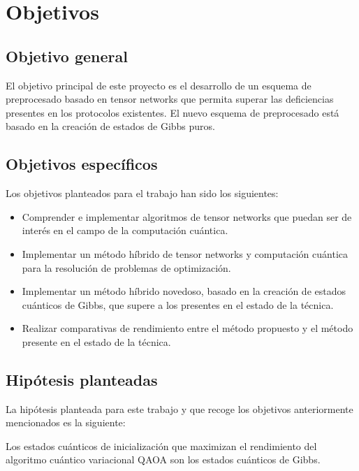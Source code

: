 \chapter{Objetivos}

\section{Objetivo general}

El objetivo principal de este proyecto es el desarrollo de un esquema de preprocesado basado en tensor networks que permita superar las deficiencias presentes en los protocolos existentes. El nuevo esquema de preprocesado está basado en la creación de estados de Gibbs puros.

\section{Objetivos específicos}

Los objetivos planteados para el trabajo han sido los siguientes:

\begin{itemize}
    
    \item Comprender e implementar algoritmos de tensor networks que puedan ser de interés en el campo de la computación cuántica.
    
    \item Implementar un método híbrido de tensor networks y computación cuántica para la resolución de problemas de optimización.
   
    \item Implementar un método híbrido novedoso, basado en la creación de estados cuánticos de Gibbs, que supere a los presentes en el estado de la técnica.
     
    \item Realizar comparativas de rendimiento entre el método propuesto y el método presente en el estado de la técnica.

\end{itemize}

\section{Hipótesis planteadas}
\label{sub_sec:hip_work}

La hipótesis planteada para este trabajo y que recoge los objetivos anteriormente mencionados es la siguiente:\\

\begin{mdframed}[backgroundcolor=black!10]
\centering 

Los estados cuánticos de inicialización que maximizan el rendimiento del algoritmo cuántico variacional QAOA son los estados cuánticos de Gibbs. 

\end{mdframed}